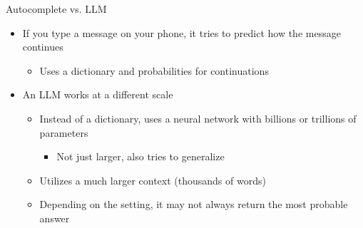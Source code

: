 \documentclass[
ps,
]{prosper}
\begin{document}
\begin{slide}{Autocomplete vs. LLM}

\begin{itemize}

\item If you type a message on your phone, it tries to predict how the message
  continues

\begin{itemize}
  
\item Uses a dictionary and probabilities for continuations

\end{itemize}
  
\item An LLM works at a different scale

\begin{itemize}

\item Instead of a dictionary, uses a neural network with billions or
  trillions of parameters

  \begin{itemize}

    \item Not just larger, also tries to generalize
    
  \end{itemize}
  
\item Utilizes a much larger context (thousands of words)

\item Depending on the setting, it may not always return the most probable answer
  
\end{itemize}

\end{itemize}
  
\end{slide}
\end{document}
